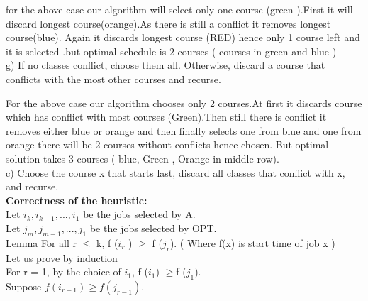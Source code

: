 \documentclass{extarticle}
\theoremstyle{remark}
\begin{document}
for the above case our algorithm will select only one course (green ).First it will discard longest course(orange).As there is still a conflict it removes longest course(blue). Again it discards longest course (RED) hence only 1 course left and it is selected .but optimal schedule is 2 courses ( courses in green and blue )\\

g) If no classes conflict, choose them all. Otherwise, discard a course that
conflicts with the most other courses and recurse.
\newline
\newline
\begin{center}

\end{center}
\vspace{0.2in}
For the above case our algorithm chooses only 2 courses.At first it discards course which has conflict with most courses (Green).Then still there is conflict it removes either blue or orange and then finally selects one from blue and one from orange there will be 2 courses without conflicts hence chosen.
  But optimal solution takes 3 courses ( blue, Green , Orange in middle row).\\
  
c) Choose the course x that starts last, discard all classes that conflict
with x, and recurse.\\

\textbf{Correctness of the  heuristic:}\\

Let $ i_k, i_{k-1}, . . . , i_1 $ be the jobs selected by A.\\
Let $ j_m, j_{m-1}, . . . , j_1 $ be the jobs selected by OPT.\\
Lemma
For all r $\leq$ k, f ($i_r$ ) $\geq$ f ($j_r$).   ( Where f(x) is start time of job x )\\

Let us prove by induction\\
For r = 1, by the choice of $i_1$, f ($i_1$) $\geq$f ($j_1$).\\ 
Suppose $f (i_{r-1}) \geq f (j_{r-1})$.\\
\end{document}
